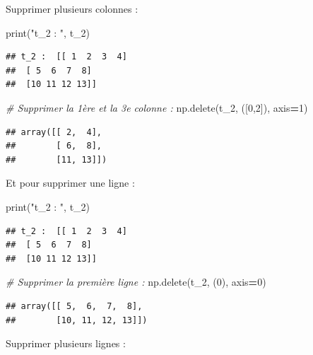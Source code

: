 \documentclass[
  12pt,
]{book}
\newenvironment{Shaded}{\begin{snugshade}}{\end{snugshade}}
\newcommand{\BuiltInTok}[1]{#1}
\newcommand{\CommentTok}[1]{\textcolor[rgb]{0.56,0.35,0.01}{\textit{#1}}}
\newcommand{\DecValTok}[1]{\textcolor[rgb]{0.00,0.00,0.81}{#1}}
\newcommand{\NormalTok}[1]{#1}
\newcommand{\OperatorTok}[1]{\textcolor[rgb]{0.81,0.36,0.00}{\textbf{#1}}}
\newcommand{\StringTok}[1]{\textcolor[rgb]{0.31,0.60,0.02}{#1}}
\numberwithin{equation}{section}
\numberwithin{countremarque}{section}
\begin{document}
Supprimer plusieurs colonnes :

\begin{Shaded}
\begin{Highlighting}[]
\BuiltInTok{print}\NormalTok{(}\StringTok{"t\_2 : "}\NormalTok{, t\_2)}
\end{Highlighting}
\end{Shaded}

\begin{lstlisting}
## t_2 :  [[ 1  2  3  4]
##  [ 5  6  7  8]
##  [10 11 12 13]]
\end{lstlisting}

\begin{Shaded}
\begin{Highlighting}[]
\CommentTok{\# Supprimer la 1ère et la 3e colonne :}
\NormalTok{np.delete(t\_2, ([}\DecValTok{0}\NormalTok{,}\DecValTok{2}\NormalTok{]), axis}\OperatorTok{=}\DecValTok{1}\NormalTok{)}
\end{Highlighting}
\end{Shaded}

\begin{lstlisting}
## array([[ 2,  4],
##        [ 6,  8],
##        [11, 13]])
\end{lstlisting}

Et pour supprimer une ligne :

\begin{Shaded}
\begin{Highlighting}[]
\BuiltInTok{print}\NormalTok{(}\StringTok{"t\_2 : "}\NormalTok{, t\_2)}
\end{Highlighting}
\end{Shaded}

\begin{lstlisting}
## t_2 :  [[ 1  2  3  4]
##  [ 5  6  7  8]
##  [10 11 12 13]]
\end{lstlisting}

\begin{Shaded}
\begin{Highlighting}[]
\CommentTok{\# Supprimer la première ligne :}
\NormalTok{np.delete(t\_2, (}\DecValTok{0}\NormalTok{), axis}\OperatorTok{=}\DecValTok{0}\NormalTok{)}
\end{Highlighting}
\end{Shaded}

\begin{lstlisting}
## array([[ 5,  6,  7,  8],
##        [10, 11, 12, 13]])
\end{lstlisting}

Supprimer plusieurs lignes :
\end{document}
